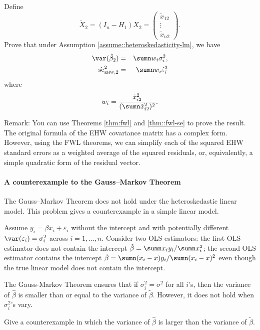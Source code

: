 Define 
$$
\tilde{X}_2 = (I_n - H_1) X_2 = \begin{pmatrix}
\tilde{x}_{12}\\
\vdots \\
\tilde{x}_{n2}
\end{pmatrix} . 
$$
Prove that under Assumption \ref{assume::heteroskedasticity-lm},  we have 
\begin{eqnarray*}
\var( \hat\beta_2  ) &=& \sumn  w_i \sigma_i^2,  \\
\hat{\text{se}}_{\textsc{ehw}, 2}^2  &=&  \sumn  w_i   \hat\varepsilon_i^2
\end{eqnarray*}
where 
$$
w_i = \frac{  \tilde{x}_{i2}^2  }{   ( \sumn    \tilde{x}_{i2}^2 )^2  } .
$$ 




Remark: You can use Theorems \ref{thm:fwl} and \ref{thm::fwl-se} to prove the result. 
The original formula of the EHW covariance matrix has a complex form. However, using the FWL theorems, we can simplify each of the squared EHW standard errors as a weighted average of the squared residuals, or, equivalently, a simple quadratic form of the residual vector. 



\paragraph{A counterexample to the Gauss--Markov Theorem}\label{hw3::counterexample-gauss-markov-heteroskedasticity}


The Gauss--Markov Theorem does not hold under the heteroskedastic linear model. This problem gives a counterexample in a simple linear model.


Assume $y_i = \beta x_i + \varepsilon_i$ without the intercept and with potentially different $\var(\varepsilon_i) = \sigma_i^2$ across $i=1,\ldots, n$. 
Consider two OLS estimators: the first OLS estimator does not contain the intercept $\hat{\beta} = \sumn x_i y_i / \sumn x_i^2$; the second OLS estimator contains the intercept $\tilde{\beta} =\sumn (x_i - \bar{x}) y_i / \sumn (x_i - \bar{x})^2 $ even though the true linear model does not contain the intercept. 


The Gauss-Markov Theorem ensures that if $\sigma_i^2=\sigma^2$ for all $i$'s, then the variance of $\hat{\beta}$ is smaller than or equal to the variance of $\tilde{\beta} $. However, it does not hold when $\sigma_i^2$'s vary. 

Give a counterexample in which the variance of $\hat{\beta}$ is larger than the variance of $\tilde{\beta} $. 





